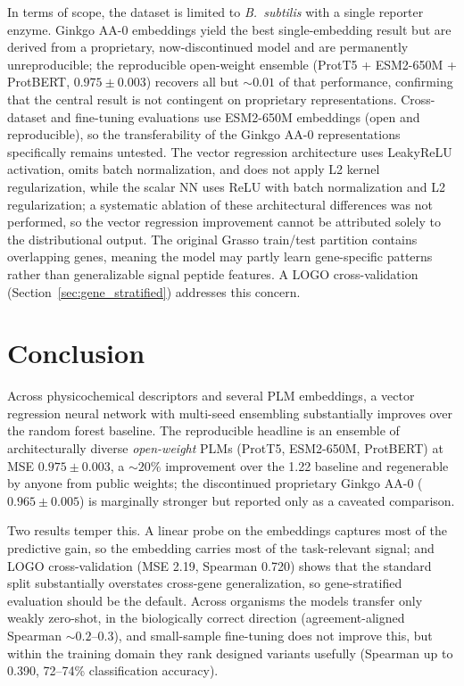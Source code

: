 \documentclass[12pt]{article}
\begin{document}
In terms of scope, the dataset is limited to \textit{B.\ subtilis} with a single reporter enzyme.
Ginkgo AA-0 embeddings yield the best single-embedding result but are derived from a proprietary, now-discontinued model and are permanently unreproducible; the reproducible open-weight ensemble (ProtT5 + ESM2-650M + ProtBERT, $0.975 \pm 0.003$) recovers all but ${\sim}0.01$ of that performance, confirming that the central result is not contingent on proprietary representations.
Cross-dataset and fine-tuning evaluations use ESM2-650M embeddings (open and reproducible), so the transferability of the Ginkgo AA-0 representations specifically remains untested.
The vector regression architecture uses LeakyReLU activation, omits batch normalization, and does not apply L2 kernel regularization,
while the scalar NN uses ReLU with batch normalization and L2 regularization; a systematic ablation of these
architectural differences was not performed, so the vector regression improvement cannot
be attributed solely to the distributional output.
The original Grasso train/test partition contains overlapping genes, meaning the model may partly learn gene-specific patterns rather than generalizable signal peptide features.
A LOGO cross-validation (Section~\ref{sec:gene_stratified}) addresses this concern.

\section{Conclusion}
\label{sec:conclusion}

Across physicochemical descriptors and several PLM embeddings, a vector regression neural network with multi-seed ensembling substantially improves over the random forest baseline. The reproducible headline is an ensemble of architecturally diverse \emph{open-weight} PLMs (ProtT5, ESM2-650M, ProtBERT) at MSE $0.975 \pm 0.003$, a ${\sim}20\%$ improvement over the 1.22 baseline and regenerable by anyone from public weights; the discontinued proprietary Ginkgo AA-0 ($0.965 \pm 0.005$) is marginally stronger but reported only as a caveated comparison.

Two results temper this. A linear probe on the embeddings captures most of the predictive gain, so the embedding carries most of the task-relevant signal; and LOGO cross-validation (MSE 2.19, Spearman 0.720) shows that the standard split substantially overstates cross-gene generalization, so gene-stratified evaluation should be the default. Across organisms the models transfer only weakly zero-shot, in the biologically correct direction (agreement-aligned Spearman ${\sim}0.2$--$0.3$), and small-sample fine-tuning does not improve this, but within the training domain they rank designed variants usefully (Spearman up to 0.390, 72--74\% classification accuracy).
\end{document}
